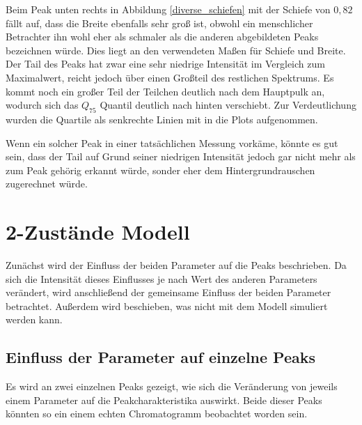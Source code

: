 Beim Peak unten rechts in Abbildung \ref{diverse_schiefen} mit der Schiefe von $0,82$ fällt auf, dass die Breite ebenfalls sehr groß ist, obwohl ein menschlicher Betrachter ihn wohl eher als schmaler als die anderen abgebildeten Peaks bezeichnen würde. Dies liegt an den verwendeten Maßen für Schiefe und Breite. Der Tail des Peaks hat zwar eine sehr niedrige Intensität im Vergleich zum Maximalwert, reicht jedoch über einen Großteil des restlichen Spektrums. Es kommt noch ein großer Teil der Teilchen deutlich nach dem Hauptpulk an, wodurch sich das $Q_{75}$ Quantil deutlich nach hinten verschiebt. Zur Verdeutlichung wurden die Quartile als senkrechte Linien mit in die Plots aufgenommen.

Wenn ein solcher Peak in einer tatsächlichen Messung vorkäme, könnte es gut sein, dass der Tail auf Grund seiner niedrigen Intensität jedoch gar nicht mehr als zum Peak gehörig erkannt würde, sonder eher dem Hintergrundrauschen zugerechnet würde.



\section{2-Zustände Modell} 
Zunächst wird der Einfluss der beiden Parameter auf die Peaks beschrieben. Da sich die Intensität dieses Einflusses je nach Wert des anderen Parameters verändert, wird anschließend der gemeinsame Einfluss der beiden Parameter betrachtet. Außerdem wird beschieben, was nicht mit dem Modell simuliert werden kann.

\subsection{Einfluss der Parameter auf einzelne Peaks}

Es wird an zwei einzelnen Peaks gezeigt, wie sich die Veränderung von jeweils einem Parameter auf die Peakcharakteristika auswirkt. Beide dieser Peaks könnten so ein einem echten Chromatogramm beobachtet worden sein.

